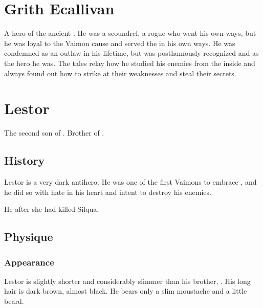 \section{Grith Ecallivan}
A hero of the ancient . 
He was a scoundrel, a rogue who went his own ways, but he was loyal to the Vaimon cause and served the \caliphate in his own ways. 
He was condemned as an outlaw in his lifetime, but was posthumously recognized and \honoured as the hero he was. 
The tales relay how he studied his enemies from the inside and always found out how to strike at their weaknesses and steal their secrets. 















\section{Lestor \Delaen}
The second son of . 
Brother of . 









\subsection{History}
Lestor is a very dark antihero. 
He was one of the first Vaimons to embrace \Itzach, and he did so with hate in his heart and intent to destroy his enemies. 

He  after she had killed Silqua. 









\subsection{Physique}
\subsubsection{Appearance}
Lestor is slightly shorter and considerably slimmer than his brother, . 
His long hair is dark brown, almost black. 
He bears only a slim moustache and a little beard. 















